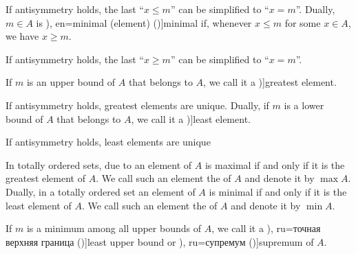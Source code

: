 \begin{definition}
\begin{thmenum}
\begin{TwoColumns}
      If antisymmetry holds, the last \enquote{\( x \leq m \)} can be simplified to \enquote{\( x = m \)}.
    \BeginSecondColumn
      Dually, \( m \in A \) is \term[ru=минимальный (елемент) (\cite[def. 3.6]{Гуров2013}), en=minimal (element) (\cite[33]{Harzheim2005})]{minimal} if, whenever \( x \leq m \) for some \( x \in A \), we have \( x \geq m \).

      If antisymmetry holds, the last \enquote{\( x \geq m \)} can be simplified to \enquote{\( x = m \)}.
    \end{TwoColumns}

    \begin{TwoColumns}
      If \( m \) is an upper bound of \( A \) that belongs to \( A \), we call it a \term[ru=наибольший (елемент) (\cite[def. 3.6]{Гуров2013})]{greatest element}.

      If antisymmetry holds, greatest elements are unique.
    \BeginSecondColumn
      Dually, if \( m \) is a lower bound of \( A \) that belongs to \( A \), we call it a \term[ru=наименьший (елемент) (\cite[def. 3.6]{Гуров2013})]{least element}.

      If antisymmetry holds, least elements are unique
    \end{TwoColumns}

    \mimprovised
    \begin{TwoColumns}
      In totally ordered sets, due to  an element of \( A \) is maximal if and only if it is the greatest element of \( A \). We call such an element the  of \( A \) and denote it by \( \max A \).
    \BeginSecondColumn
      Dually, in a totally ordered set an element of \( A \) is minimal if and only if it is the least element of \( A \). We call such an element the  of \( A \) and denote it by \( \min A \).
    \end{TwoColumns}

    \begin{TwoColumns}
      If \( m \) is a minimum among all upper bounds of \( A \), we call it a \term[bg=точна горна граница (\cite[19]{Тагамлицки1971Диф}), ru=точная верхняя граница (\cite[]{Ляпин1960})]{least upper bound} or \term[bg=супремум (\cite[10]{Проданов1982}), ru=супремум (\cite[]{Ляпин1960})]{supremum} of \( A \).


\end{TwoColumns}
\end{thmenum}
\end{definition}
